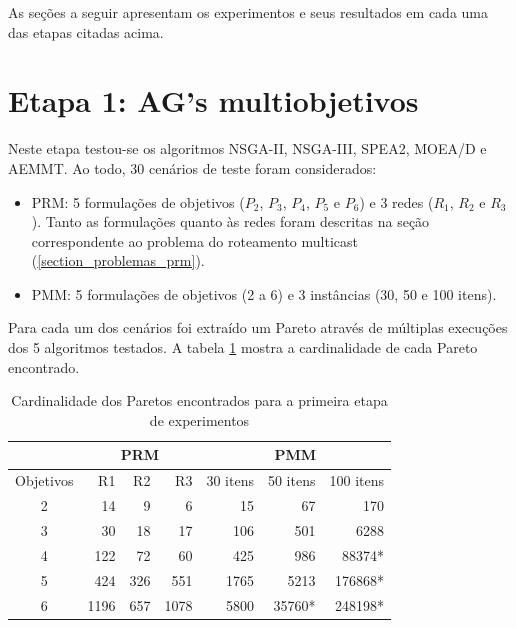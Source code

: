 As seções a seguir apresentam os experimentos e seus resultados em cada uma das etapas citadas acima.

\section{Etapa 1: AG's multiobjetivos}

Neste etapa testou-se os algoritmos NSGA-II, NSGA-III, SPEA2, MOEA/D e AEMMT. Ao todo, 30 cenários de teste foram considerados:

\begin{itemize}
	\item PRM: 5 formulações de objetivos ($P_2$, $P_3$, $P_4$, $P_5$ e $P_6$) e 3 redes ($R_1$, $R_2$ e $R_3$). Tanto as formulações quanto às redes foram descritas na seção correspondente ao problema do roteamento multicast (\ref{section_problemas_prm}).
	\item PMM: 5 formulações de objetivos (2 a 6) e 3 instâncias (30, 50 e 100 itens).
\end{itemize}

Para cada um dos cenários foi extraído um Pareto através de múltiplas execuções dos 5 algoritmos testados. A tabela \ref{table_exp1_paretos} mostra a cardinalidade de cada Pareto encontrado.

\begin{table}[!htbp]
	\centering
	\caption{Cardinalidade dos Paretos encontrados para a primeira etapa de experimentos}
	\label{table_exp1_paretos}
	\begin{tabular}{c|rrr|rrr}
		& \multicolumn{3}{c|}{\textbf{PRM}} & \multicolumn{3}{c}{\textbf{PMM}} \\ \hline
		Objetivos & R1         & R2       & R3        & 30 itens  & 50 itens & 100 itens \\ \hline
		2         & 14         & 9        & 6         & 15        & 67       & 170       \\
		3         & 30         & 18       & 17        & 106       & 501      & 6288      \\
		4         & 122        & 72       & 60        & 425       & 986      & 88374*    \\
		5         & 424        & 326      & 551       & 1765      & 5213     & 176868*   \\
		6         & 1196       & 657      & 1078      & 5800      & 35760*   & 248198*   \\ \hline
	\end{tabular}
\end{table}

